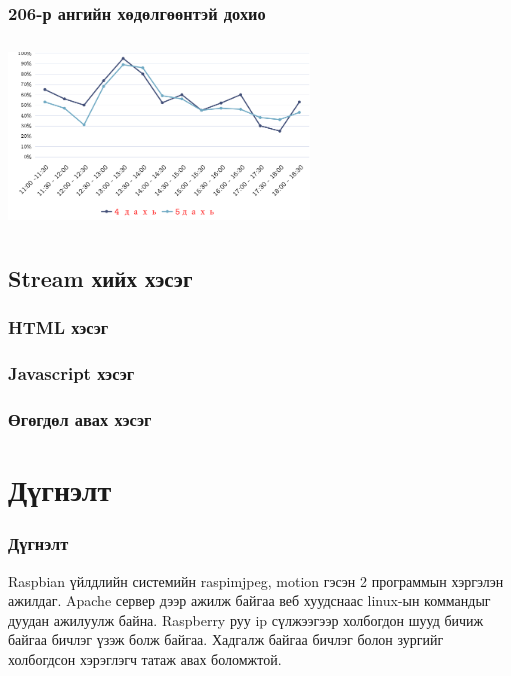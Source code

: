  
\begin{frame}
\frametitle{206-р ангийн хөдөлгөөнтэй дохио}
\begin{center}
\includegraphics[width=8cm,height=5cm ]{figures/dig.png}
\end{center}

\end{frame}

\subsection{ Stream хийх хэсэг} 
\begin{frame}
\frametitle{HTML хэсэг}
\html
\end{frame}

\begin{frame}
\frametitle{Javascript хэсэг}
\js
\end{frame}
 
\begin{frame}
\frametitle{Өгөгдөл авах хэсэг}
\php
\end{frame}
 

\section{Дүгнэлт} 
\begin{frame}
\frametitle{Дүгнэлт}
\begin{block}{}
\justifying
Raspbian үйлдлийн системийн raspimjpeg, motion гэсэн 2 программын хэргэлэн ажилдаг. Apache сервер дээр ажилж байгаа веб хуудснаас linux-ын коммандыг дуудан ажилуулж байна. Raspberry руу ip сүлжээгээр холбогдон шууд бичиж байгаа бичлэг үзэж болж байгаа. Хадгалж байгаа бичлэг болон зургийг холбогдсон хэрэглэгч татаж авах боломжтой. 
\end{block}

\end{frame}